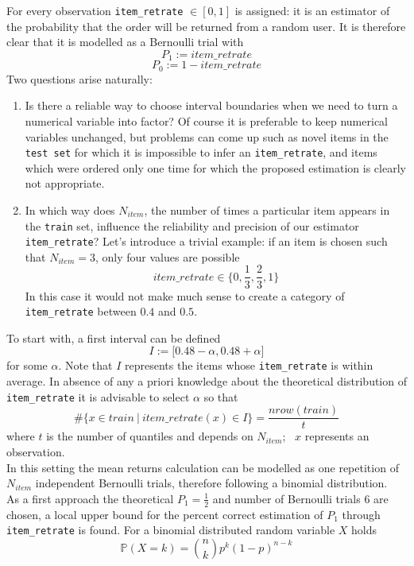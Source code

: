 \documentclass[a4paper,12pt]{article}
\begin{document}
For every observation \texttt{item\_retrate} $\in [0,1]$ is assigned: it is an estimator of the probability that the order will be returned from a random user. It is therefore clear that it is modelled as a Bernoulli trial with $$P_1:=item\_retrate$$ $$P_0:=1- item\_retrate$$
\newline
Two questions arise naturally:
\begin{enumerate}
\item Is there a reliable way to choose interval boundaries when we need to turn a numerical variable into factor?
\newline
Of course it is preferable to keep numerical  variables unchanged, but problems can come up such as novel items in the \texttt{test set} for which it is impossible to infer an \texttt{item\_retrate}, and items which were ordered only one time for which the proposed estimation is clearly not appropriate.
\item In which way does $N_{item}$, the number of times a particular item appears in the \texttt{train} set, influence the reliability and precision of our estimator \texttt{item\_retrate}?
\newline
Let's introduce a trivial example:
if an item is chosen such that $N_{item}=3$, only four values are possible $$item\_retrate \in  \bigg\{0,\frac{1}{3},\frac{2}{3} ,1\bigg\}$$ In this case it would not make much sense to create a category of \texttt{item\_retrate} between $0.4$ and $0.5$.
\end{enumerate}

To start with, a first interval can be defined $$I:=\big[0.48-\alpha, 0.48+ \alpha\big]$$ for some $\alpha$.
Note that $I$ represents the items whose \texttt{item\_retrate} is within average.
In absence of any a priori knowledge about the theoretical distribution of \texttt{item\_retrate} it is advisable to select $\alpha$ so that
$$\# \big\{ x \in train \ | \ item\_retrate(x) \in I \big\}=\frac{nrow(train)}{t} $$ where $t$ is the number of quantiles and depends on $N_{item}$; \ $x$ represents an observation. \\
In this setting the mean returns calculation can be modelled as one repetition of $N_{item}$ independent Bernoulli trials, therefore following a binomial distribution.\\
As a first approach the theoretical $P_1=\frac{1}{2}$ and number of Bernoulli trials $6$ are chosen, a local upper bound for the percent correct estimation of $P_1$ through \texttt{item\_retrate} is found.
For a binomial distributed random variable $X$ holds
$$\mathbb{P}(X=k) = \binom{n}{k} p^k (1-p)^{n-k}$$
\end{document}
